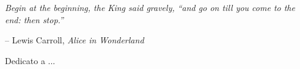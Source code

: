 
\cleardoublepage
{}
\thispagestyle{empty}

\vspace*{3cm}

\epigraph{\itshape Begin at the beginning, the King said gravely, ``and go on till you come to the end: then stop.''}{-- Lewis Carroll, \textit{Alice in Wonderland}}

\medskip

\begin{center}
Dedicato a ...
\end{center}
